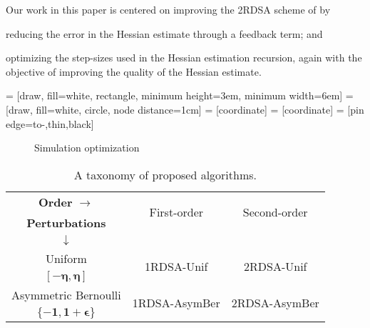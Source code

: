 \documentclass[twocolumn]{IEEEtran}
\begin{document}
Our work in this paper is centered on improving the 2RDSA scheme of \cite{prashanth2015rdsa} by \\
\begin{inparaenum}[\bfseries (i)]
\item reducing the error in the Hessian estimate through a feedback term; and\\
\item optimizing the step-sizes used in the Hessian estimation recursion, again with the objective of improving the quality of the Hessian estimate.
\end{inparaenum}

 = [draw, fill=white, rectangle,
   minimum height=3em, minimum width=6em]
 = [draw, fill=white, circle, node distance=1cm]
 = [coordinate]
 = [coordinate]
 = [pin edge={to-,thin,black}]

 \begin{figure}[t]
    \centering
{}
\caption{Simulation optimization}
\label{fig:so}
\end{figure}

\begin{table}
\caption{A taxonomy of proposed algorithms.}
\label{tab:algos}
\centering
\begin{tabular}{c|c|c}
\toprule
\textbf{Order }$\bm{\rightarrow}$ & \multirow{2}{*}{First-order} & \multirow{2}{*}{Second-order} \\ 
\textbf{Perturbations} &&\\
$\bm{\downarrow}$ &&\\
\midrule
Uniform  & \multirow{2}{*}{1RDSA-Unif} & \multirow{2}{*}{2RDSA-Unif} \\ 
$\bm{[-\eta,\eta]}$ &&\\
\midrule
Asymmetric Bernoulli & \multirow{2}{*}{1RDSA-AsymBer} & \multirow{2}{*}{2RDSA-AsymBer} \\ 
 $\bm{\{-1,1+\epsilon\}}$ &&\\
 \bottomrule
\end{tabular}
\end{table}
\end{document}
